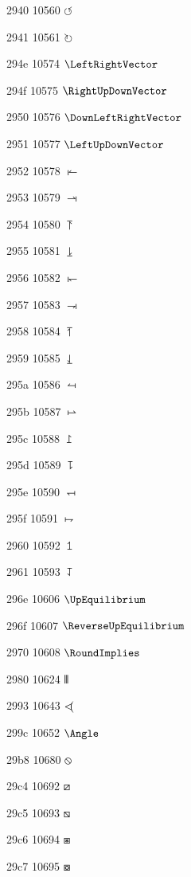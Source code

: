 \documentclass[11pt]{article}
\begin{document}
2940 10560 \ensuremath{\circlearrowleft}

2941 10561 \ensuremath{\circlearrowright}

294e 10574 \ensuremath{\LeftRightVector}

294f 10575 \ensuremath{\RightUpDownVector}

2950 10576 \ensuremath{\DownLeftRightVector}

2951 10577 \ensuremath{\LeftUpDownVector}

2952 10578 \ensuremath{\LeftVectorBar}

2953 10579 \ensuremath{\RightVectorBar}

2954 10580 \ensuremath{\RightUpVectorBar}

2955 10581 \ensuremath{\RightDownVectorBar}

2956 10582 \ensuremath{\DownLeftVectorBar}

2957 10583 \ensuremath{\DownRightVectorBar}

2958 10584 \ensuremath{\LeftUpVectorBar}

2959 10585 \ensuremath{\LeftDownVectorBar}

295a 10586 \ensuremath{\LeftTeeVector}

295b 10587 \ensuremath{\RightTeeVector}

295c 10588 \ensuremath{\RightUpTeeVector}

295d 10589 \ensuremath{\RightDownTeeVector}

295e 10590 \ensuremath{\DownLeftTeeVector}

295f 10591 \ensuremath{\DownRightTeeVector}

2960 10592 \ensuremath{\LeftUpTeeVector}

2961 10593 \ensuremath{\LeftDownTeeVector}

296e 10606 \ensuremath{\UpEquilibrium}

296f 10607 \ensuremath{\ReverseUpEquilibrium}

2970 10608 \ensuremath{\RoundImplies}

2980 10624 \ensuremath{\Vvert}

2993 10643 \ensuremath{<\kern-0.58em(}

299c 10652 \ensuremath{\Angle}

29b8 10680 \ensuremath{\obslash}

29c4 10692 \ensuremath{\boxdiag}

29c5 10693 \ensuremath{\boxbslash}

29c6 10694 \ensuremath{\boxast}

29c7 10695 \ensuremath{\boxcircle}
\end{document}

